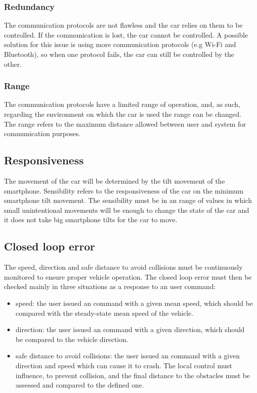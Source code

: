 \subsubsection{Redundancy}
\label{sec:orgc5933fc}
The communication protocols are not flawless and the car relies on them to be controlled. If the communication is lost, the car cannot be controlled. A possible solution for this issue is using more communication protocols (e.g Wi-Fi and Bluetooth), so when one protocol fails, the car can still be controlled by the other.
\subsubsection{Range}%
\label{sec:org447a205}
The communication protocols have a limited range of operation, and, as such, regarding the environment on which the car is used the range can be changed.
The range refers to the maximum distance allowed between user and system for communication purposes.
\subsection{Responsiveness}%
\label{sec:org622e63a}
The movement of the car will be determined by the tilt movement of the smartphone. Sensibility refers to the responsiveness of the car on the minimum smartphone tilt movement. The sensibility must be in an range of values in which small unintentional movements will be enough to change the state of the car and it does not take big smartphone tilts for the car to move.
\subsection{Closed loop error}%
\label{sec:closed-loop-error-specs}
The speed, direction and safe distance to avoid collisions must be continuously monitored to ensure proper vehicle operation. The closed loop error must then be checked mainly in three situations as a response to an user command:
\begin{itemize}
\item speed: the user issued an command with a given mean speed, which should be compared with the steady-state mean speed of the vehicle.
\item direction: the user issued an command with a given direction, which should be compared to the vehicle direction.
\item safe distance to avoid collisions: the user issued an command with a given direction and speed which can cause it to crash. The local control must influence, to prevent collision, and the final distance to the obstacles must be assessed and compared to the defined one.
\end{itemize}
